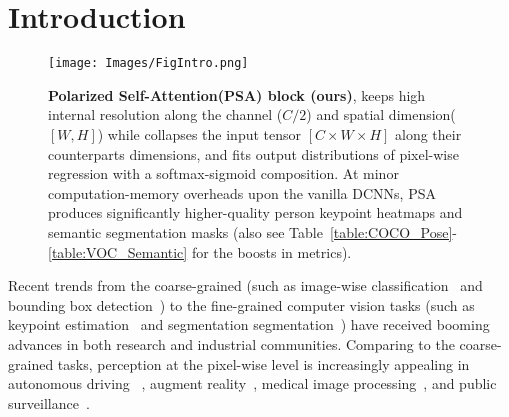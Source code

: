 \documentclass[10pt,twocolumn,letterpaper]{article}
\begin{document}
\section{Introduction}
\begin{figure}[!htb]
\centering
\texttt{[image: Images/FigIntro.png]}
\caption{\textbf{Polarized Self-Attention(PSA) block (ours)}, keeps high internal resolution along the channel ($C/2$) and spatial dimension($[W,H]$) while collapses the input tensor $[C\times W\times H]$ along their counterparts dimensions, and fits output distributions of pixel-wise regression with a softmax-sigmoid composition. At minor computation-memory overheads upon the vanilla DCNNs, PSA produces significantly higher-quality person keypoint heatmaps and semantic segmentation masks (also see Table~\ref{table:COCO_Pose}-\ref{table:VOC_Semantic} for the boosts in metrics). }
  \label{fig:Intro}
\end{figure}
Recent trends from the coarse-grained (such as image-wise classification~\cite{Russakovsky15ImageNet} and bounding box detection~\cite{Girshick15FastR-CNN}) to the fine-grained computer vision tasks (such as keypoint estimation~\cite{Luo21} and segmentation segmentation~\cite{Zhong20}) have received booming advances in both research and industrial communities. Comparing to the coarse-grained tasks, perception at the pixel-wise level is increasingly appealing in autonomous driving ~\cite{Treml16}, augment reality~\cite{Chiu18}, medical image processing~\cite{Litjens17}, and public surveillance~\cite{Wang21}. 
\end{document}
